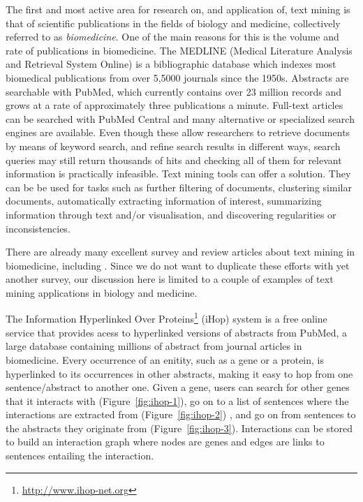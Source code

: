 The first and most active area for research on, and application of, text mining is that of scientific publications in the fields of biology and medicine, collectively referred to as \emph{biomedicine}.
One of the main reasons for this is the volume and rate of publications in biomedicine.
The MEDLINE (Medical Literature Analysis and Retrieval System Online) is a bibliographic database which indexes most biomedical publications from over 5,5000 journals since the 1950s.
Abstracts are searchable with PubMed, which currently contains over 23 million records and grows at a rate of approximately three publications a minute.
Full-text articles can be searched with PubMed Central and many alternative or specialized search engines are available. 
Even though these allow researchers to retrieve documents by means of keyword search, and refine search results in different ways, search queries may still return thousands of hits and checking all of them for relevant information is practically infeasible.
Text mining tools can offer a solution.
They can be be used for tasks such as further filtering of documents, clustering similar documents, automatically extracting information of interest, summarizing information through text and/or visualisation, and discovering regularities or inconsistencies.

There are already many excellent survey and review articles about text mining in biomedicine, including
\citep{Neves2012Survey,Simpson2012Biomedical,Andronis2011Literature,Ananiadou2010Event,RodriguezEsteban2009Biomedical,Zweigenbaum2009Advanced,Cohen2008Getting,Zweigenbaum2007Frontiers,Ananiadou2006,Erhardt2006Status,JenEA06,Spasic2005Text,Cohen2005Survey,Krauthammer2004Term,Blake2011Text,Krallinger2010Analysis}.
Since we do not want to duplicate these efforts with yet another survey, our discussion here is limited to a couple of examples of text mining applications in biology and medicine.

The Information Hyperlinked Over Proteins\footnote{\url{http://www.ihop-net.org}} (iHop) system \citep{hoffmann2004gene} is a free online service that provides acess to hyperlinked versions of abstracts from PubMed, a large database containing millions of abstract from journal articles in biomedicine.
Every occurrence of an enitity, such as a gene or a protein, is hyperlinked to its occurrences in other abstracts, making it easy to hop from one sentence/abstract to another one.
Given a gene, users can search for other genes that it interacts with (Figure~\ref{fig:ihop-1}), go on to a list of sentences where the interactions are extracted from (Figure~\ref{fig:ihop-2}) , and go on from sentences to the abstracts they originate from  (Figure~\ref{fig:ihop-3}).   
Interactions can be stored to build an interaction graph where nodes are genes and edges are links to sentences entailing the interaction. 

